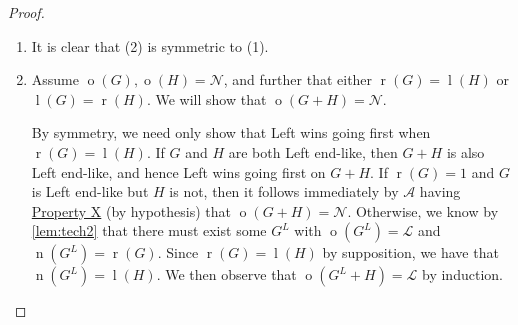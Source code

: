 \documentclass[11pt]{article}
\theoremstyle{definition}
\DeclareMathOperator{\outcome}{o}
\newcommand{\set}[1]{\mathcal{#1}}
\DeclareMathOperator{\ltp}{l}
\DeclareMathOperator{\ntp}{n}
\DeclareMathOperator{\rtp}{r}
\begin{document}
\begin{proof}
\begin{enumerate}
            We now proceed with (b). Recall that $\outcome(G)=\mathscr{L}$ and
            $\outcome(H)=\mathscr{N}$, and assume further that
            $\rtp(G)=\ltp(H)$. We will show that $\outcome(G+H)=\mathscr{N}$.

            We will show that Right has a winning option on $G+H$. First we
            demonstrate that $H$ cannot be a Right end. It follows from
            \cref{thm:tipping-points} that $\rtp(G)\geq2$ (since
            $\outcome(G)=\mathscr{L}$). If $H$ were a Right end, then
            $\ltp(H)=1$ by \cref{prop:ends-tp}. This contradicts our
            supposition that $\ltp(H)=\rtp(G)$, and hence $H$ is not a Right
            end.

            Since $\ltp(H)\neq1$, we know by the symmetric result of
            \cref{lem:tech2} that there must exist some option $H^R$ with
            $\outcome(H^R)=\mathscr{R}$ and $\ntp(H^R)=\ltp(H)$. Since
            $\rtp(G)=\ltp(H)$ by supposition, we have that $\ntp(H^R)=\rtp(G)$.
            And now we observe that $\outcome(G+H^R)=\mathscr{R}$ by induction.
            Thus, Right has a good option, and so
            $\outcome(G+H)\leq\mathscr{N}$. But we already know that
            $\outcome(G+H)\geq\mathscr{N}$ since $\set{A}$ is outcome-stable,
            and hence we have that $\outcome(G+H)=\mathscr{N}$ when
            $\rtp(G)=\ltp(H)$, as desired.

        \item It is clear that (2) is symmetric to (1).

        \item Assume $\outcome(G),\outcome(H)=\mathscr{N}$, and further that
            either $\rtp(G)=\ltp(H)$ or $\ltp(G)=\rtp(H)$. We will show that
            $\outcome(G+H)=\mathscr{N}$.

            By symmetry, we need only show that Left wins going first when
            $\rtp(G)=\ltp(H)$. If $G$ and $H$ are both Left end-like, then
            $G+H$ is also Left end-like, and hence Left wins going first on
            $G+H$. If $\rtp(G)=1$ and $G$ is Left end-like but $H$ is not, then
            it follows immediately by $\set{A}$ having
            \hyperlink{prop:X}{Property X} (by hypothesis) that
            $\outcome(G+H)=\mathscr{N}$. Otherwise, we know by \cref{lem:tech2}
            that there must exist some $G^L$ with $\outcome(G^L)=\mathscr{L}$
            and $\ntp(G^L)=\rtp(G)$. Since $\rtp(G)=\ltp(H)$ by supposition, we
            have that $\ntp(G^L)=\ltp(H)$. We then observe that
            $\outcome(G^L+H)=\mathscr{L}$ by induction.


\end{enumerate}
\end{proof}
\end{document}
